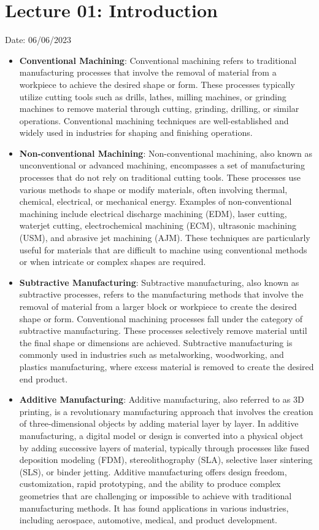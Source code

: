 \documentclass{article}
\begin{document}
\section{Lecture 01: Introduction} 
\hfill Date: 06/06/2023
\begin{itemize}
  \item \textbf{Conventional Machining}: Conventional machining refers to traditional manufacturing processes that involve the removal of material from a workpiece to achieve the desired shape or form. These processes typically utilize cutting tools such as drills, lathes, milling machines, or grinding machines to remove material through cutting, grinding, drilling, or similar operations. Conventional machining techniques are well-established and widely used in industries for shaping and finishing operations.

\item \textbf{Non-conventional Machining}: Non-conventional machining, also known as unconventional or advanced machining, encompasses a set of manufacturing processes that do not rely on traditional cutting tools. These processes use various methods to shape or modify materials, often involving thermal, chemical, electrical, or mechanical energy. Examples of non-conventional machining include electrical discharge machining (EDM), laser cutting, waterjet cutting, electrochemical machining (ECM), ultrasonic machining (USM), and abrasive jet machining (AJM). These techniques are particularly useful for materials that are difficult to machine using conventional methods or when intricate or complex shapes are required.

\item \textbf{Subtractive Manufacturing}: Subtractive manufacturing, also known as subtractive processes, refers to the manufacturing methods that involve the removal of material from a larger block or workpiece to create the desired shape or form. Conventional machining processes fall under the category of subtractive manufacturing. These processes selectively remove material until the final shape or dimensions are achieved. Subtractive manufacturing is commonly used in industries such as metalworking, woodworking, and plastics manufacturing, where excess material is removed to create the desired end product.

\item \textbf{Additive Manufacturing}: Additive manufacturing, also referred to as 3D printing, is a revolutionary manufacturing approach that involves the creation of three-dimensional objects by adding material layer by layer. In additive manufacturing, a digital model or design is converted into a physical object by adding successive layers of material, typically through processes like fused deposition modeling (FDM), stereolithography (SLA), selective laser sintering (SLS), or binder jetting. Additive manufacturing offers design freedom, customization, rapid prototyping, and the ability to produce complex geometries that are challenging or impossible to achieve with traditional manufacturing methods. It has found applications in various industries, including aerospace, automotive, medical, and product development. 
\end{itemize}
\end{document}

